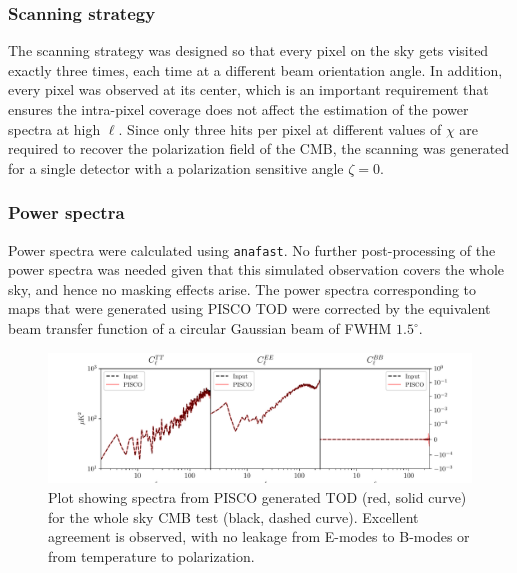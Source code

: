 \documentclass[a4paper,11pt]{article}
\begin{document}
\subsubsection{Scanning strategy}

The scanning strategy was designed so that every pixel on the sky gets visited exactly three times, each time at a different beam orientation angle. In addition, every pixel was observed at its center, which is an important requirement that ensures the intra-pixel coverage does not affect the estimation of the power spectra at high $\ell$. Since only three hits per pixel at different values of $\chi$ are required to recover the polarization field of the CMB, the scanning was generated for a single detector with a polarization sensitive angle $\zeta=0$.

\subsubsection{Power spectra}

Power spectra were calculated using \texttt{anafast}. No further post-processing of the power spectra was needed given that this simulated observation covers the whole sky, and hence no masking effects arise. The power spectra corresponding to maps that were generated using PISCO TOD were corrected by the equivalent beam transfer function of a circular Gaussian beam of FWHM $1.5^\circ$. 

\begin{figure}
	\centering
	\includegraphics[width=1\linewidth]{figures/cmb_r0d00_CLASS_wholeskytest.pdf}
	\caption{Plot showing spectra from PISCO generated TOD (red, solid curve) for the whole sky CMB test (black, dashed curve). Excellent agreement is observed, with no leakage from E-modes to B-modes or from temperature to polarization. }
	\label{fig::pisco4wholesky}
\end{figure}

\end{document}
